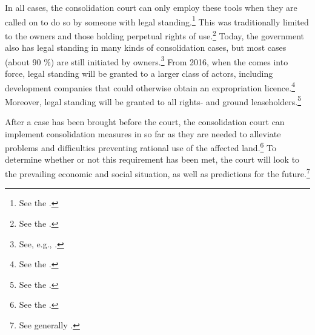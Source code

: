 In all cases, the consolidation court can only employ these tools when they are called on to do so by someone with legal standing.\footnote{See the \dni\cite[5]{lca79}.} This was traditionally limited to the owners and those holding perpetual rights of use.\footnote{See the \dni\cite[5]{lca79}.} Today, the government also has legal standing in many kinds of consolidation cases, but most cases (about 90 \%) are still initiated by owners.\footnote{See, e.g., \cite[135]{bjerva12}.} From 2016, when the \cite{lca13} comes into force, legal standing will be granted to a larger class of actors, including development companies that could otherwise obtain an expropriation licence.\footnote{See the \dni\cite[1-5(3)]{lca13}.} Moreover, legal standing will be granted to all rights- and ground leaseholders.\footnote{See the \dni\cite[1-5(1)]{lca13}.}

After a case has been brought before the court, the consolidation court can implement consolidation measures in so far as they are needed to alleviate problems and difficulties preventing rational use of the affected land.\footnote{See the \dni\cite[1]{lca79}.} To determine whether or not this requirement has been met, the court will look to the prevailing economic and social situation, as well as predictions for the future.\footnote{See generally \cite{reiten09}.} %

